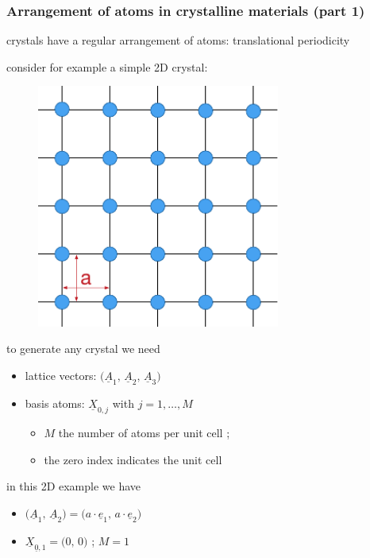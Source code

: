 \begin{frame}
  \frametitle{Arrangement of atoms in crystalline materials (part 1)}
  
  crystals have a regular arrangement of atoms: translational periodicity
  \begin{multicols}{2}
    \noindent
    consider for example a simple 2D crystal:
    
    \vspace{0.3em}
    \begin{figure}
      \centering
      \includegraphics[width=8cm, keepaspectratio=true]{sections/cosserat_rods/images/CrystalLattice2D}
    \end{figure}
    
    to generate any crystal we need
    \begin{itemize}
      \item lattice vectors: $\bigl( \underline{A}_1, \, \underline{A}_2 , \, \underline{A}_3 \bigr)$
      \item basis atoms: $\underline{X}_{0,j}$ with $j = 1, \dots , M$
        \begin{itemize}
          \item $M$ the number of atoms per unit cell ;
          \item the zero index indicates the unit cell
        \end{itemize}
    \end{itemize}
    
    \vspace{0.8em}
    in this 2D example we have
    \begin{itemize}
      \item $\bigl( \underline{A}_1, \, \underline{A}_2 \bigr) = \bigl( a \cdot \underline{e}_1, \, a \cdot \underline{e}_2 \bigr)$
      \item $\underline{X}_{\underline{0},1} = \bigl( 0 , \, 0 \bigr)$ \: ; $M=1$
    \end{itemize}
    
  \end{multicols}
  

\end{frame}


